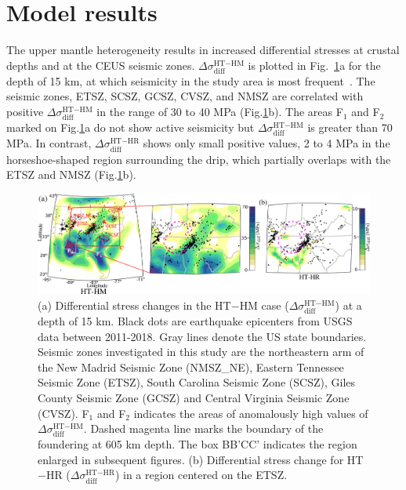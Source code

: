 \documentclass[draft,linenumbers]{agujournal2018}
\begin{document}
\section{Model results}
%
The upper mantle heterogeneity results in increased differential stresses at crustal depths and at the CEUS seismic zones. $\Delta \sigma_{\text{diff}}^{\text{HT}-\text{HM}}$
is plotted in Fig.~\ref{df_model}a for the depth of 15 km, at which seismicity in the study area is most frequent~\citep[e.g.,][]{mazzotti2010state}. The seismic zones, ETSZ, SCSZ, GCSZ, CVSZ, and NMSZ are correlated with positive $\Delta \sigma_{\text{diff}}^{\text{HT}-\text{HM}}$ in the range of 30 to 40 MPa (Fig.\ref{df_model}b). The areas F$_{1}$ and F$_{2}$ marked on Fig.\ref{df_model}a do not show active seismicity but $\Delta \sigma_{\text{diff}}^{\text{HT}-\text{HM}}$ is greater than 70 MPa. In contrast, $\Delta\sigma_{\text{diff}}^{\text{HT}-\text{HR}}$ shows only small positive values, 2 to 4 MPa in the horseshoe-shaped region surrounding the drip, which partially overlaps with the ETSZ and NMSZ (Fig.\ref{df_model}b).
%
\begin{figure}[h!]
    \centering
    \includegraphics[width=\linewidth]{figures/diff_stress_model.png}
    \caption{(a) Differential stress changes in the HT$-$HM case ($\Delta \sigma_{\text{diff}}^{\text{HT}-\text{HM}}$) at a depth of 15 km. Black dots are earthquake epicenters from USGS data between 2011-2018. Gray lines denote the US state boundaries. Seismic zones investigated in this study are the northeastern arm of the New Madrid Seismic Zone (NMSZ\_NE), Eastern Tennessee Seismic Zone (ETSZ), South Carolina Seismic Zone (SCSZ), Giles County Seismic Zone (GCSZ) and Central Virginia Seismic Zone (CVSZ). F$_1$ and F$_2$ indicates the areas of anomalously high values of $\Delta \sigma_{\text{diff}}^{\text{HT}-\text{HM}}$. Dashed magenta line marks the boundary of the foundering at 605 km depth. The box BB'CC' indicates the region enlarged in subsequent figures. (b) Differential stress change for HT$-$HR ($\Delta \sigma_{\text{diff}}^{\text{HT}-\text{HR}}$) in a region centered on the ETSZ. }
    \label{df_model}
\end{figure}
\end{document}
